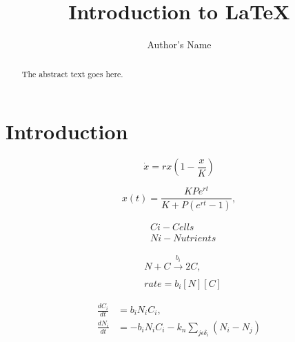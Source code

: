 \documentclass{article}
\begin{document}
\title{Introduction to \LaTeX{}}
\author{Author's Name}

\maketitle

\begin{abstract}
The abstract text goes here.
\end{abstract}

\section{Introduction}


\begin{equation}
\label{eq:1}
\dot{x} = rx\left(1 - \frac{x}{K}\right)
\end{equation}

\begin{equation}
\label{eq:2}
x(t) = \frac{KPe^{rt}}{K + P(e^{rt}-1)},
\end{equation}

\begin{subequations}
	\begin{align}
	&C{i} - Cells\\
	&N{i} - Nutrients
	\end{align}
\end{subequations}

\begin{subequations}
	\label{eq:9}
	\begin{align}
		&N + C \xrightarrow[]{b_{i}} 2C,\\
		&rate = b_{i}[N][C]
	\end{align}
\end{subequations}

\begin{subequations}
	\label{eq:5}
	\begin{align}
	\frac{dC_{i}}{dt}& = b_{i}N_{i}C_{i},\\
	\frac{dN_{i}}{dt}& = - b_{i}N_{i}C_{i} - k_{n}\sum_{j \epsilon \delta_i}(N_{i} - N_{j})\\
	\end{align}
\end{subequations}
\end{document}
